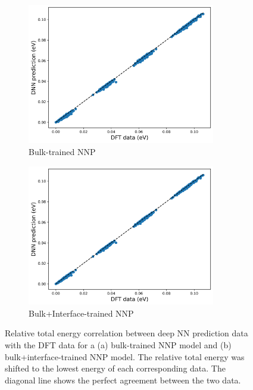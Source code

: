 \begin{figure}[tbhp!]
	\centering
	\begin{subfigure}{0.47\textwidth}
		\centering

		\includegraphics[width=0.9\textwidth]{images/bulk_NN_on_interface/2_e_peratom.png}
		\caption{Bulk-trained NNP}\label{fig:corr_bulk_NN_E}
	\end{subfigure}
	\hfill
	\begin{subfigure}{0.47\textwidth}
		\centering

		\includegraphics[width=0.9\textwidth]{images/bulk+interface_NN_on_interface/2_e_peratom.png}
		\caption{Bulk+Interface-trained NNP}\label{fig:corr_bulk+interface_NN_E}
	\end{subfigure}
	\caption{Relative total energy correlation between deep NN prediction data with
		the DFT data
		for a
		(a) bulk-trained NNP model and (b) bulk+interface-trained NNP
		model. The relative total energy was shifted to the lowest energy of each corresponding data. The diagonal line shows the perfect agreement between the two
		data.}\label{fig:corr_E}
\end{figure}

